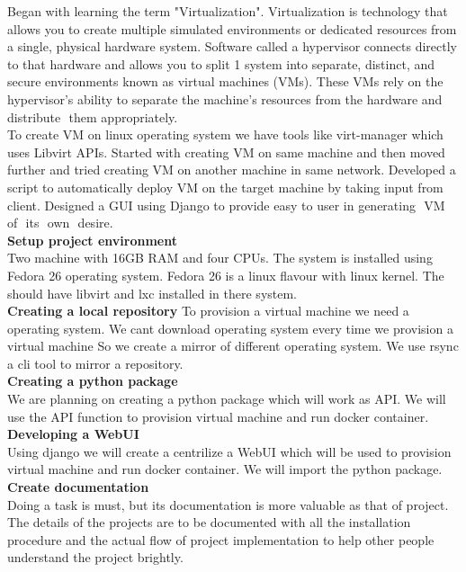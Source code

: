 \documentclass[a4paper,12pt]{report}
\begin{document}
Began with learning the term "Virtualization". Virtualization is technology
that allows you to create multiple simulated environments or dedicated resources
from a single, physical hardware system. Software called a hypervisor connects
directly to that hardware and allows you to split 1 system into separate, distinct,
and secure environments known as virtual machines (VMs). These VMs rely on
the hypervisor’s ability to separate the machine’s resources from the hardware and
distribute​ ​ them​ ​ appropriately.\\
\newline
To create VM on linux operating system we have tools like virt-manager
which uses Libvirt APIs. Started with creating VM on same machine and then
moved further and tried creating VM on another machine in same network.
Developed a script to automatically deploy VM on the target machine by taking
input from client. Designed a GUI using Django to provide easy to user in
generating​ ​ VM​ ​ of​ ​ its​ ​ own​ ​ desire.\\
\newline
\textbf{Setup project environment}\\
Two machine with 16GB RAM and four CPUs. The system is installed using Fedora 26 operating system. Fedora 26 is a linux flavour with linux kernel. The should have libvirt and lxc installed in there system. \\
\newline
\textbf{Creating a local repository}
To provision a virtual machine we need a operating system. We cant download operating system every time we provision a virtual machine So we create a mirror of different operating system. We use rsync a cli tool to mirror a repository. \\
\newline
\textbf{Creating a python package}\\
We are planning on creating a python package which will work as API. We will use the API function to provision virtual machine and run docker container. \\
\newline
\textbf{Developing a WebUI}\\
Using django we will create a centrilize a WebUI which will be used to provision virtual machine and run docker container. We will import the python package. \\
\newline
\textbf{Create documentation}\\
Doing a task is must, but its documentation is more valuable as that of project. The details of the projects are to be documented with all the installation procedure and the actual flow of project implementation to help other people understand the project brightly.\\
\end{document}
